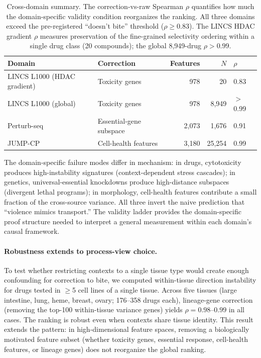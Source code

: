 \documentclass{article}
\begin{document}
\begin{table}[t]
\centering
\caption{Cross-domain summary. The correction-vs-raw Spearman $\rho$
quantifies how much the domain-specific validity condition reorganizes
the ranking. All three domains exceed the pre-registered ``doesn't bite''
threshold ($\rho \geq 0.83$). The LINCS HDAC gradient $\rho$ measures
preservation of the fine-grained selectivity ordering within a single drug
class (20 compounds); the global 8{,}949-drug $\rho > 0.99$.}
\label{tab:cross_domain}
\small
\begin{tabular}{llrrl}
\toprule
Domain & Correction & Features & $N$ & $\rho$ \\
\midrule
LINCS L1000 (HDAC gradient) & Toxicity genes & 978 & 20 & 0.83 \\
LINCS L1000 (global) & Toxicity genes & 978 & 8{,}949 & $>$0.99 \\
Perturb-seq & Essential-gene subspace & 2{,}073 & 1{,}676 & 0.91 \\
JUMP-CP & Cell-health features & 3{,}180 & 25{,}254 & 0.99 \\
\bottomrule
\end{tabular}
\end{table}

The domain-specific failure modes differ in mechanism: in drugs, cytotoxicity
produces high-instability signatures (context-dependent stress cascades); in
genetics, universal-essential knockdowns produce high-distance subspaces
(divergent lethal programs); in morphology, cell-health features contribute
a small fraction of the cross-source variance. All three invert the naive
prediction that ``violence mimics transport.'' The validity ladder provides
the domain-specific proof structure needed to interpret a general measurement
within each domain's causal framework.

\paragraph{Robustness extends to process-view choice.}
To test whether restricting contexts to a single tissue type would create
enough confounding for correction to bite, we computed within-tissue
direction instability for drugs tested in $\geq$5 cell lines of a single
tissue. Across five tissues (large intestine, lung, heme, breast, ovary;
176--358 drugs each), lineage-gene correction (removing the top-100
within-tissue variance genes) yields $\rho = 0.98$--$0.99$ in all cases.
The ranking is robust even when contexts share tissue identity. This
result extends the pattern: in high-dimensional feature spaces, removing
a biologically motivated feature subset (whether toxicity genes, essential
response, cell-health features, or lineage genes) does not reorganize the
global ranking.
\end{document}
